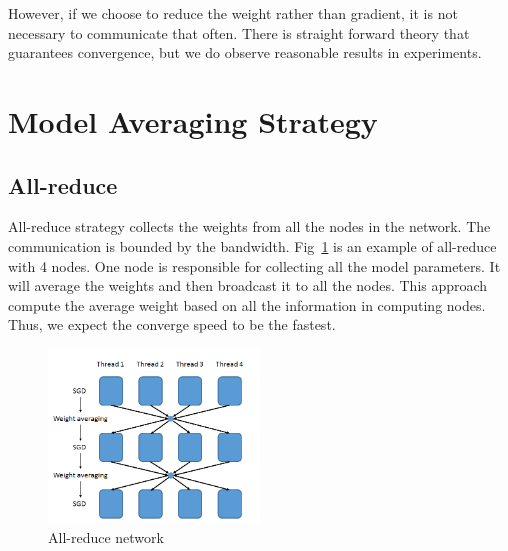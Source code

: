 \documentclass{article}
\begin{document}
However, if we choose to reduce the weight rather than gradient, it is not necessary to communicate that often. There
is straight forward theory that guarantees convergence, but we do observe reasonable results in experiments.


\section{Model Averaging Strategy}
\subsection{All-reduce}
All-reduce strategy collects the weights from all the nodes in the network. The communication is bounded by 
the bandwidth. Fig~\ref{fig:allreduce} is an example of all-reduce with 4 nodes. One node is responsible for
collecting all the model parameters. It will average the weights and then broadcast it to all the nodes. 
This approach compute the average weight based on all the information in computing nodes. Thus, we expect 
the converge speed to be the fastest.
\begin{figure}[htb]
  \centering
  \includegraphics[width=0.5\textwidth]{allreduce.png}
  \caption{All-reduce network}
  \label{fig:allreduce}
\end{figure}
\end{document}
